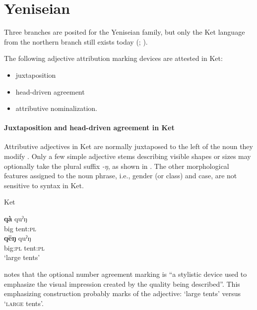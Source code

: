\section{Yeniseian}
\label{yeniseian synchr}
Three branches are posited for the Yeniseian family, but only the Ket language from the northern branch still exists today (\citealt{werner1997a}; \citealt[223]{salminen2007}).

The following adjective attribution marking devices are attested in Ket:
\begin{itemize}
\item juxtaposition
\item head\hyp{}driven agreement
\item attributive nominalization.
\end{itemize}

\paragraph*{Juxtaposition and head\hyp{}driven agreement in Ket}
Attributive adjectives in Ket are normally juxtaposed to the left of the noun they modify \citep[38]{vajda2004}. Only a few simple adjective stems describing visible shapes or sizes may optionally take the plural suffix \textit{-ŋ}, as shown in . The other morphological features assigned to the noun phrase, i.e., gender (or class) and case, are not sensitive to syntax in Ket.
\begin{exe}
\ex 
\label{ket agr}
\rm{Ket \citep[38]{vajda2004}} 
\begin{xlist}
\ex	
\gll	\textbf{qà} quˀŋ\\
	big tent:\textsc{pl}\\
\ex	
\gll	\textbf{qēŋ} quˀŋ\\
	big:\textsc{pl} tent:\textsc{pl}\\
\glt	‘large tents’
\end{xlist}
\end{exe}
\citet[38]{vajda2004} notes that the optional number agreement marking is “a stylistic device used to emphasize the visual impression created by the quality being described”. This emphasizing construction probably marks  of the adjective: ‘large tents’ versus ‘\textsc{large} tents’.

